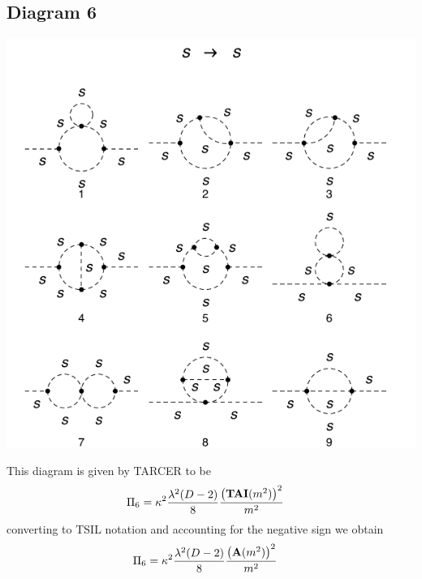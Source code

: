 \documentclass[11pt]{article}
\begin{document}
\subsection*{Diagram 6}
\begin{center}
\includegraphics{2loop_6.pdf}
\end{center}
This diagram is given by TARCER to be
\begin{align}
\Pi_6 &= \kappa^2 \frac{\lambda^2(D-2)}{8}\frac{ \left({\tt{\mathbf{TAI}}} (m^2)\right)^2}{ m^2 }  
\end{align}
converting to TSIL notation and accounting for the negative sign we obtain
\begin{align}
\Pi_6 &= \kappa^2 \frac{\lambda^2(D-2)}{8}\frac{ \left({\tt{\mathbf{A}}} (m^2)\right)^2}{ m^2 }  
\end{align}
\end{document}

